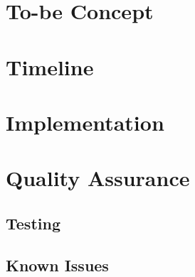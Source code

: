\documentclass{scrreprt}
\begin{document}



	\chapter{To-be Concept}
		\label{c:tb-concept}




	\chapter{Timeline}
		\label{c:timeline}




	\chapter{Implementation}
		\label{c:implementation}




	\chapter{Quality Assurance}
		\label{c:qa}

		\section{Testing}
			\label{s:qa_testing}



		\section{Known Issues}
			\label{s:qa_known-issues}




	\listoffigures
	\listoftables
\end{document}
